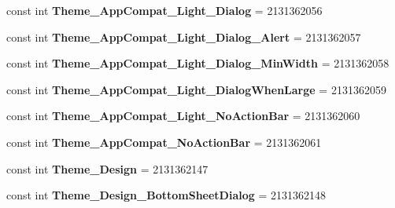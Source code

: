 \begin{DoxyCompactItemize}
const int {\bfseries Theme\+\_\+\+App\+Compat\+\_\+\+Light\+\_\+\+Dialog} = 2131362056
\item 
\mbox{\label{class_sample_app_1_1_droid_1_1_resource_1_1_style_ab2fe8f2c632c916a6c50a4ec7e75c1b9}} 
const int {\bfseries Theme\+\_\+\+App\+Compat\+\_\+\+Light\+\_\+\+Dialog\+\_\+\+Alert} = 2131362057
\item 
\mbox{\label{class_sample_app_1_1_droid_1_1_resource_1_1_style_ad4b7659493d46e18a718fbbff6504590}} 
const int {\bfseries Theme\+\_\+\+App\+Compat\+\_\+\+Light\+\_\+\+Dialog\+\_\+\+Min\+Width} = 2131362058
\item 
\mbox{\label{class_sample_app_1_1_droid_1_1_resource_1_1_style_a8b31cef3761b14b85bc38eb5eaa6a1f9}} 
const int {\bfseries Theme\+\_\+\+App\+Compat\+\_\+\+Light\+\_\+\+Dialog\+When\+Large} = 2131362059
\item 
\mbox{\label{class_sample_app_1_1_droid_1_1_resource_1_1_style_ae498c84f499c2235175a8eb4cd22e32d}} 
const int {\bfseries Theme\+\_\+\+App\+Compat\+\_\+\+Light\+\_\+\+No\+Action\+Bar} = 2131362060
\item 
\mbox{\label{class_sample_app_1_1_droid_1_1_resource_1_1_style_ab04a81a4603aaaa54580128f2fd60ffd}} 
const int {\bfseries Theme\+\_\+\+App\+Compat\+\_\+\+No\+Action\+Bar} = 2131362061
\item 
\mbox{\label{class_sample_app_1_1_droid_1_1_resource_1_1_style_a0acf1cf1491294669763edcd5770210b}} 
const int {\bfseries Theme\+\_\+\+Design} = 2131362147
\item 
\mbox{\label{class_sample_app_1_1_droid_1_1_resource_1_1_style_a12f964af4bdee900a925b4bc4ea3fd41}} 
const int {\bfseries Theme\+\_\+\+Design\+\_\+\+Bottom\+Sheet\+Dialog} = 2131362148
\item 
\mbox{\label{class_sample_app_1_1_droid_1_1_resource_1_1_style_acb04dc91f18da800c78e2b595a85b8ec}} 

\end{DoxyCompactItemize}
